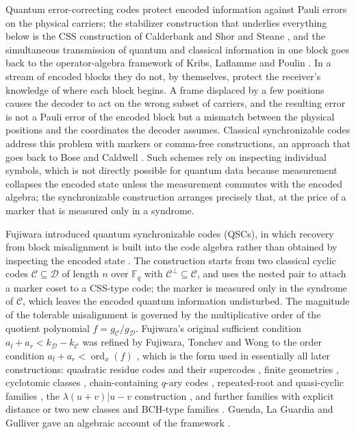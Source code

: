 \documentclass[11pt,reqno]{amsart}
\theoremstyle{definition}
\theoremstyle{remark}
\newcommand{\F}{\mathbb{F}}
\newcommand{\ord}{\operatorname{ord}}
\begin{document}
Quantum error-correcting codes protect encoded information against Pauli errors on the physical carriers; the stabilizer construction that underlies everything below is the CSS construction of Calderbank and Shor \cite{CalderbankShor1996} and Steane \cite{Steane1996}, and the simultaneous transmission of quantum and classical information in one block goes back to the operator-algebra framework of Kribs, Laflamme and Poulin \cite{KribsLaflammePoulin2005}. In a stream of encoded blocks they do not, by themselves, protect the receiver's knowledge of where each block begins. A frame displaced by a few positions causes the decoder to act on the wrong subset of carriers, and the resulting error is not a Pauli error of the encoded block but a mismatch between the physical positions and the coordinates the decoder assumes. Classical synchronizable codes address this problem with markers or comma-free constructions, an approach that goes back to Bose and Caldwell \cite{BoseCaldwell1967}. Such schemes rely on inspecting individual symbols, which is not directly possible for quantum data because measurement collapses the encoded state unless the measurement commutes with the encoded algebra; the synchronizable construction arranges precisely that, at the price of a marker that is measured only in a syndrome.


Fujiwara introduced quantum synchronizable codes (QSCs), in which recovery from block misalignment is built into the code algebra rather than obtained by inspecting the encoded state \cite{Fujiwara2013}. The construction starts from two classical cyclic codes $\mathcal C\subseteq\mathcal D$ of length $n$ over $\F_q$ with $\mathcal C^\perp\subseteq\mathcal C$, and uses the nested pair to attach a marker coset to a CSS-type code; the marker is measured only in the syndrome of $\mathcal C$, which leaves the encoded quantum information undisturbed. The magnitude of the tolerable misalignment is governed by the multiplicative order of the quotient polynomial $f=g_{\mathcal C}/g_{\mathcal D}$. Fujiwara's original sufficient condition $a_l+a_r<k_{\mathcal D}-k_{\mathcal C}$ was refined by Fujiwara, Tonchev and Wong to the order condition $a_l+a_r<\ord_x(f)$ \cite{FujiwaraTonchevWong2013}, which is the form used in essentially all later constructions: quadratic residue codes and their supercodes \cite{XieYuanFujiwara2014}, finite geometries \cite{FujiwaraVandendriessche2014}, cyclotomic classes \cite{LiZhuLiu2019,ShiYueHuang2021,LiZhu2022}, chain-containing $q$-ary codes \cite{XieYangYuan2016}, repeated-root and quasi-cyclic families \cite{LuoMa2018,DuMaLiu2023}, the $\lambda(u+v)|u-v$ construction \cite{DuMaLuoWang2020}, and further families with explicit distance or two new classes \cite{LuoMaLin2019,LiuKai2023} and BCH-type families \cite{SunEtAl2023}. Guenda, La Guardia and Gulliver gave an algebraic account of the framework \cite{GuendaEtAl2017}.
\end{document}
